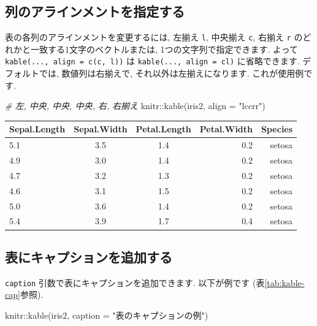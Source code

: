 \documentclass[
  11pt,
]{bxjsreport}
\newenvironment{Shaded}{\begin{snugshade}}{\end{snugshade}}
\newcommand{\AttributeTok}[1]{\textcolor[rgb]{0.77,0.63,0.00}{#1}}
\newcommand{\CommentTok}[1]{\textcolor[rgb]{0.56,0.35,0.01}{\textit{#1}}}
\newcommand{\FunctionTok}[1]{\textcolor[rgb]{0.00,0.00,0.00}{#1}}
\newcommand{\NormalTok}[1]{#1}
\newcommand{\SpecialCharTok}[1]{\textcolor[rgb]{0.00,0.00,0.00}{#1}}
\newcommand{\StringTok}[1]{\textcolor[rgb]{0.31,0.60,0.02}{#1}}
\begin{document}
\hypertarget{specify-column-alignment}{%
\subsection{列のアラインメントを指定する}\label{specify-column-alignment}}

表の各列のアラインメントを変更するには, 左揃え \texttt{l}, 中央揃え \texttt{c}, 右揃え \texttt{r} のどれかと一致する1文字のベクトルまたは, 1つの文字列で指定できます. よって \texttt{kable(..., align = c(\textquotesingle{}c\textquotesingle{},\ \textquotesingle{}l\textquotesingle{}))} は \texttt{kable(..., align = \textquotesingle{}cl\textquotesingle{})} に省略できます. デフォルトでは, 数値列は右揃えで, それ以外は左揃えになります. これが使用例です.

\begin{Shaded}
\begin{Highlighting}[numbers=left,,]
\CommentTok{\# 左, 中央, 中央, 中央, 右, 右揃え}
\NormalTok{knitr}\SpecialCharTok{::}\FunctionTok{kable}\NormalTok{(iris2, }\AttributeTok{align =} \StringTok{"lccrr"}\NormalTok{)}
\end{Highlighting}
\end{Shaded}

\begin{tabular}{l|c|c|r|r}
\hline
Sepal.Length & Sepal.Width & Petal.Length & Petal.Width & Species\\
\hline
5.1 & 3.5 & 1.4 & 0.2 & setosa\\
\hline
4.9 & 3.0 & 1.4 & 0.2 & setosa\\
\hline
4.7 & 3.2 & 1.3 & 0.2 & setosa\\
\hline
4.6 & 3.1 & 1.5 & 0.2 & setosa\\
\hline
5.0 & 3.6 & 1.4 & 0.2 & setosa\\
\hline
5.4 & 3.9 & 1.7 & 0.4 & setosa\\
\hline
\end{tabular}

\hypertarget{kable-caption}{%
\subsection{表にキャプションを追加する}\label{kable-caption}}

\texttt{caption} 引数で表にキャプションを追加できます. 以下が例です (表\ref{tab:kable-cap}参照).

\begin{Shaded}
\begin{Highlighting}[numbers=left,,]
\NormalTok{knitr}\SpecialCharTok{::}\FunctionTok{kable}\NormalTok{(iris2, }\AttributeTok{caption =} \StringTok{"表のキャプションの例"}\NormalTok{)}
\end{Highlighting}
\end{Shaded}
\end{document}
